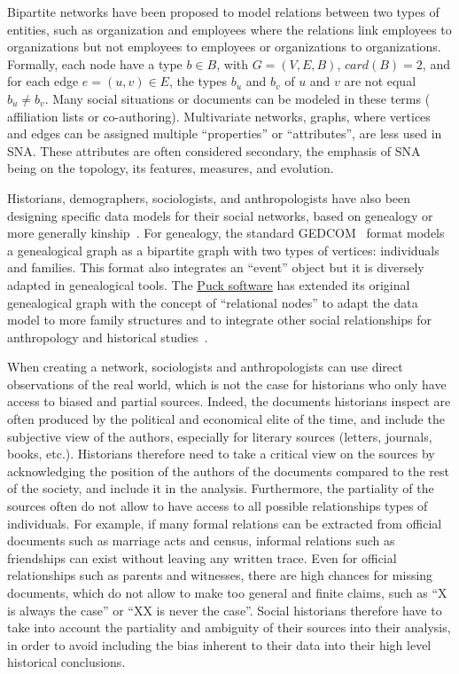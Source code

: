 Bipartite networks have been proposed to model relations between two types of entities, such as organization and employees where the relations link employees to organizations but not employees to employees or organizations to organizations\cite{borgattiSocialNetworkAnalysis2009}.
Formally, each node have a type $b \in B$, with $G = (V, E, B)$, $card(B) = 2$, and for each edge $e = (u, v) \in E$, the types $b_u$ and $b_v$ of $u$ and $v$ are not equal $b_u \neq b_v$.
Many social situations or documents can be modeled in these terms (%
affiliation lists or co-authoring).
Multivariate networks, \ie graphs, where vertices and edges can be assigned multiple ``properties'' or ``attributes'', are less used in SNA\@.
These attributes are often considered secondary, the emphasis of SNA being on the topology, its features, measures, and evolution.

Historians, demographers, sociologists, and anthropologists have also been designing specific data models for their social networks, based on genealogy or more generally kinship~\cite{hambergerKinshipNetworkAnalysis2011}.
For genealogy, the standard GEDCOM~\cite{gedcom} format models a genealogical graph as a bipartite graph with two types of vertices: individuals and families.
This format also integrates an ``event'' object but it is diversely adapted in genealogical tools.
The \href{https://www.kintip.net/}{Puck software} has extended its original genealogical graph with the concept of ``relational nodes'' to adapt the data model to more family structures and to integrate other social relationships for anthropology and historical studies~\cite{hambergerScanningPatternsRelationship2014}.

When creating a network, sociologists and anthropologists can use direct observations of the real world, which is not the case for historians who only have access to biased and partial sources.
Indeed, the documents historians inspect are often produced by the political and economical elite of the time, and include the subjective view of the authors, especially for literary sources (letters, journals, books, etc.).
Historians therefore need to take a critical view on the sources by acknowledging the position of the authors of the documents compared to the rest of the society, and include it in the analysis\cite{lemercierQuantitativeMethodsHumanities2019}.
Furthermore, the partiality of the sources often do not allow to have access to all possible relationships types of individuals.
For example, if many formal relations can be extracted from official documents such as marriage acts and census, informal relations such as friendships can exist without leaving any written trace\cite{lemercier12FormalNetwork2015}.
Even for official relationships such as parents and witnesses, there are high chances for missing documents, which do not allow to make too general and finite claims, such as ``X is always the case'' or ``XX is never the case''\cite{alexanderAnalysisAncientNetwork1990}.
Social historians therefore have to take into account the partiality and ambiguity of their sources into their analysis, in order to avoid including the bias inherent to their data into their high level historical conclusions.




